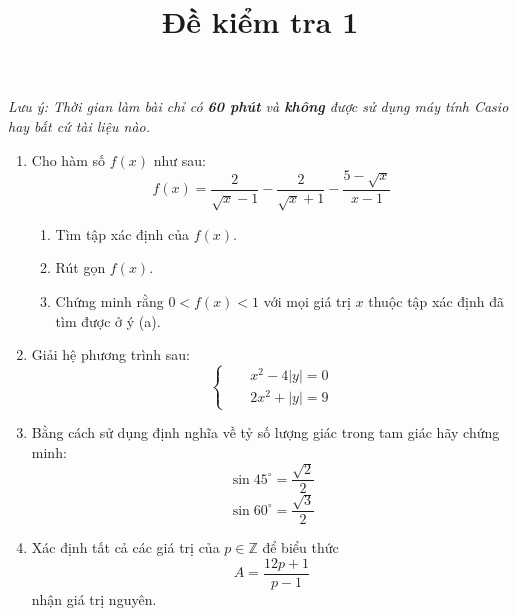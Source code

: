 \documentclass{article}
\title{Đề kiểm tra 1}
\begin{document}
\maketitle
\textit{Lưu ý: Thời gian làm bài chỉ có \textbf{60 phút} và \textbf{không} được sử dụng máy tính Casio hay bất cứ tài liệu nào.}
\begin{enumerate}[start=1,label={\bfseries Câu  \arabic*:},leftmargin=1in]
\item Cho hàm số $f(x)$ như sau:
\begin{equation*}
f(x)=\frac{2}{\sqrt{x}-1}-\frac{2}{\sqrt{x}+1}-\frac{5-\sqrt{x}}{x-1}
\end{equation*}
\begin{enumerate}
    \item Tìm tập xác định của $f(x)$.
    \item Rút gọn $f(x)$.
    \item Chứng minh rằng $0<f(x)<1$ với mọi giá trị $x$ thuộc tập xác định đã tìm được ở ý (a).
\end{enumerate}
\item Giải hệ phương trình sau:
\begin{equation*}
    \left\{\begin{aligned}
        &&x^2-4|y|=0\\
        &&2x^2+|y|=9
    \end{aligned}\right.
\end{equation*}
\item Bằng cách sử dụng định nghĩa về tỷ số lượng giác trong tam giác hãy chứng minh:
\begin{equation}
    \sin{45^\circ=\frac{\sqrt{2}}{2}}
\end{equation}
\begin{equation}
    \sin{60^\circ=\frac{\sqrt{3}}{2}}
\end{equation}
\item Xác định tất cả các giá trị của $p\in\mathbb{Z}$ để biểu thức $$A=\frac{12p+1}{p-1}$$ nhận giá trị nguyên.
\end{enumerate}
\end{document}
